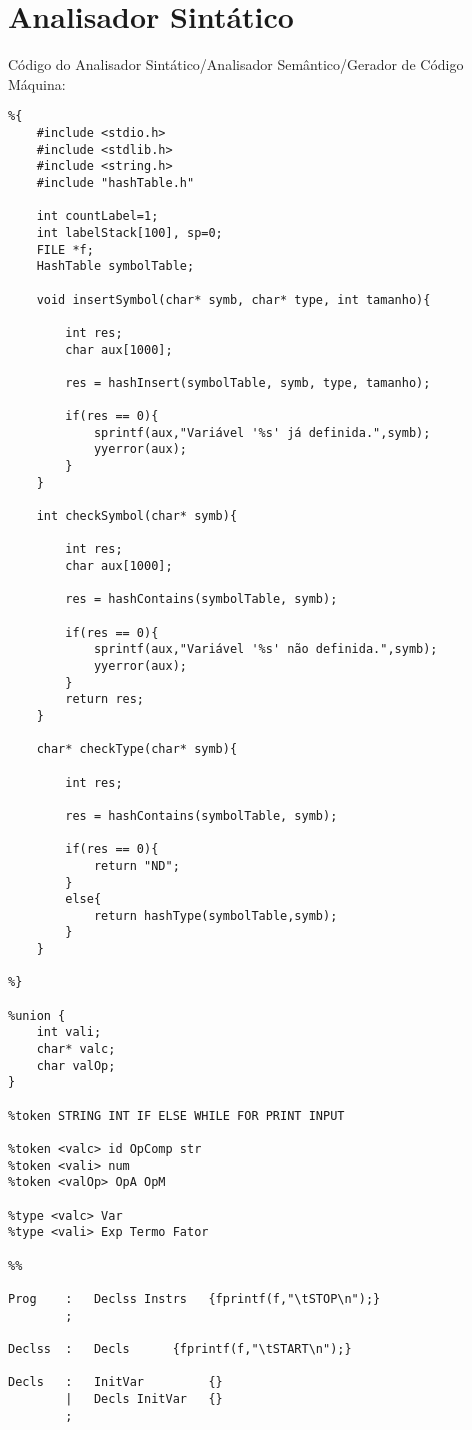 \documentclass{report}
\begin{document}
\section{Analisador Sintático}Código do Analisador Sintático/Analisador Semântico/Gerador de Código Máquina:
\begin{verbatim}
%{
    #include <stdio.h>
    #include <stdlib.h>
    #include <string.h>
    #include "hashTable.h"

    int countLabel=1;
    int labelStack[100], sp=0;
    FILE *f;
    HashTable symbolTable;

    void insertSymbol(char* symb, char* type, int tamanho){

        int res;
        char aux[1000];

        res = hashInsert(symbolTable, symb, type, tamanho);

        if(res == 0){
            sprintf(aux,"Variável '%s' já definida.",symb);
            yyerror(aux);
        }
    }

    int checkSymbol(char* symb){

        int res;
        char aux[1000];

        res = hashContains(symbolTable, symb);

        if(res == 0){
            sprintf(aux,"Variável '%s' não definida.",symb);
            yyerror(aux);
        }
        return res;
    }

    char* checkType(char* symb){

        int res;

        res = hashContains(symbolTable, symb);

        if(res == 0){
            return "ND";
        }
        else{
            return hashType(symbolTable,symb);
        }
    }

%}

%union {
    int vali;
    char* valc;
    char valOp;
}

%token STRING INT IF ELSE WHILE FOR PRINT INPUT 

%token <valc> id OpComp str
%token <vali> num
%token <valOp> OpA OpM

%type <valc> Var
%type <vali> Exp Termo Fator

%%

Prog    :   Declss Instrs   {fprintf(f,"\tSTOP\n");}
        ;

Declss  :   Decls      {fprintf(f,"\tSTART\n");}

Decls   :   InitVar         {}
        |   Decls InitVar   {}
        ;


\end{verbatim}
\end{document}
